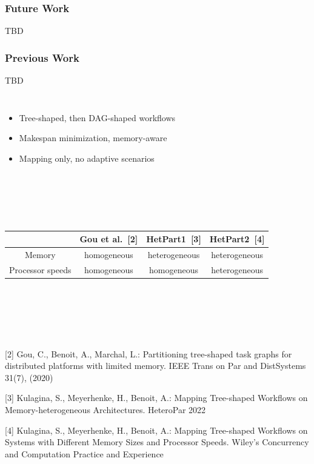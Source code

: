 \documentclass[xcolor=svgnames,titlepage,english,presentation]{beamer}
\begin{document}
\begin{frame}%
    \frametitle{Future Work}

TBD


\end{frame}


\begin{frame}[t]
    \frametitle{Previous Work}

TBD 
     \begin{columns}
        \begin{itemize}
            \item Tree-shaped, then DAG-shaped workflows
            \item Makespan minimization, memory-aware
            \item Mapping only, no adaptive scenarios
        \end{itemize}
        \begin{figure}
        \vspace{-1cm}
            \centering
        \end{figure}
    \end{columns}

    ~~~~~~~~~~~~~

    ~~~~~~~~~~~~~~~~~~~~
     
    \begin{tabular}{|c||c||c|c|}
        \hline
        & Gou et al.~[2] & HetPart1~[3] & HetPart2~[4]  \\
        \hline
        Memory & \cellcolor{pink}homogeneous & \cellcolor{lime} heterogeneous & \cellcolor{lime}heterogeneous\\
        \hline
        Processor speeds & \cellcolor{pink}homogeneous & \cellcolor{pink}homogeneous & \cellcolor{lime}heterogeneous\\
        \hline
    \end{tabular}

   ~~~~~~~~~~~~~~~~~~~~~~

~~~~~~~~~~~~~~~~~~~~~~~~~~~~

~~~~~~~~~~~~~~~~~~~~
    
    \footnotesize{[2] Gou, C., Benoit, A., Marchal, L.: Partitioning tree-shaped task graphs for distributed platforms with limited memory. IEEE Trans on Par and DistSystems 31(7), (2020)}
    
    \footnotesize{[3] Kulagina, S., Meyerhenke, H., Benoit, A.: Mapping Tree-shaped Workflows on Memory-heterogeneous Architectures. HeteroPar 2022} 
    
    \footnotesize{[4] Kulagina, S., Meyerhenke, H., Benoit, A.: Mapping Tree-shaped Workflows on Systems with Different Memory Sizes and Processor Speeds. Wiley's Concurrency and Computation Practice and Experience}

\end{frame}
\end{document}
